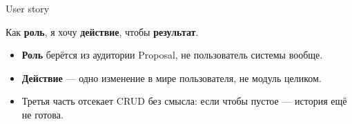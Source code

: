 \begin{frame}{User story}

  \medskip
  {\large Как \textbf{роль}, я хочу \textbf{действие}, чтобы \textbf{результат}.}

  \vspace{0.8em}
  \begin{itemize}\setlength\itemsep{0.4em}
    \item \textbf{Роль} берётся из аудитории Proposal, не \flqq пользователь системы\frqq{} вообще.
    \item \textbf{Действие} --- одно изменение в мире пользователя, не модуль целиком.
    \item Третья часть отсекает CRUD без смысла: если \flqq чтобы\frqq{} пустое --- история ещё не готова.
  \end{itemize}
\end{frame}
